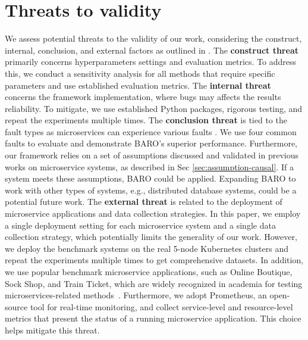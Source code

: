 
\section{Threats to validity}

We assess potential threats to the validity of our work, considering the construct, internal, conclusion, and external factors as outlined in \cite{wohlin2012experimentation}. The \textbf{construct threat} primarily concerns hyperparameters settings and evaluation metrics. To address this, we conduct a sensitivity analysis for all methods that require specific parameters and use established evaluation metrics. The \textbf{internal threat} concerns the framework implementation, where bugs may affects the results reliability. To mitigate, we use established Python packages, rigorous testing, and repeat the experiments multiple times. The \textbf{conclusion threat} is tied to the fault types as microservices can experience various faults \cite{mariani2018localizing}. We use four common faults to evaluate and demonstrate BARO's superior performance. Furthermore, our framework relies on a set of assumptions discussed and validated in previous works on microservice systems, as described in Sec \ref{sec:assumption-causal}. If a system meets these assumptions, BARO could be applied. Expanding BARO to work with other types of systems, e.g., distributed database systems, could be a potential future work. The \textbf{external threat} is related to the deployment of microservice applications and data collection strategies. In this paper, we employ a single deployment setting for each microservice system and a single data collection strategy, which potentially limits the generality of our work.  However, we deploy the benchmark systems on the real 5-node Kubernetes clusters and repeat the experiments multiple times to get comprehensive datasets. In addition, we use popular benchmark microservice applications, such as Online Boutique, Sock Shop, and Train Ticket, which are widely recognized in academia for testing microservices-related methods~\cite{Jinjin2018Microscope, Azam2022rcd, wu2021microdiag, Xin2023CausalRCA, wu2022automatic, he2022graph, dan2021practical, yu2021microrank, zhou2018trainticket, Wang2021evalcausal}. Furthermore, we adopt Prometheus, an open-source tool for real-time monitoring, and collect service-level and resource-level metrics that present the status of a running microservice application. This choice helps mitigate this threat.


